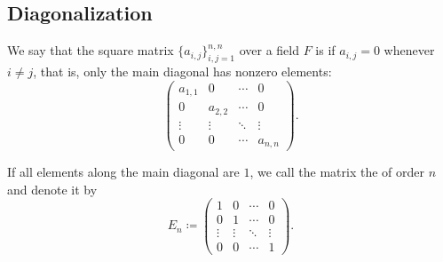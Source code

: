\subsection{Diagonalization}\label{subsec:diagonalization}

\begin{definition}\label{def:diagonal_matrix}
  We say that the square matrix \( \{ a_{i,j} \}_{i,j=1}^{n,n} \) over a field \( F \) is  if \( a_{i,j} = 0 \) whenever \( i \neq j \), that is, only the main diagonal has nonzero elements:
  \begin{equation*}
    \begin{pmatrix}
      a_{1,1} & 0       & \cdots & 0 \\
      0       & a_{2,2} & \cdots & 0 \\
      \vdots  & \vdots  & \ddots & \vdots \\
      0       & 0       & \cdots & a_{n,n}
    \end{pmatrix}.
  \end{equation*}

  If all elements along the main diagonal are \( 1 \), we call the matrix the  of order \( n \) and denote it by
  \begin{equation*}
    E_n \coloneqq
    \begin{pmatrix}
      1       & 0       & \cdots & 0 \\
      0       & 1       & \cdots & 0 \\
      \vdots  & \vdots  & \ddots & \vdots \\
      0       & 0       & \cdots & 1
    \end{pmatrix}.
  \end{equation*}
\end{definition}
